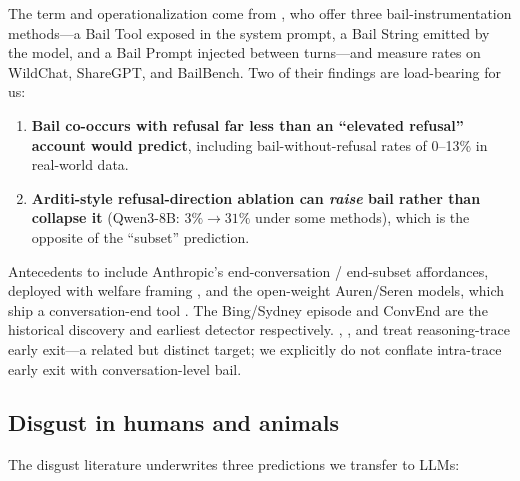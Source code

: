 \documentclass{article}
\begin{document}
The term and operationalization come from \citet{ensign2025bail}, who offer
three bail-instrumentation methods---a Bail Tool exposed in the system prompt,
a Bail String emitted by the model, and a Bail Prompt injected between
turns---and measure rates on WildChat, ShareGPT, and BailBench. Two of their
findings are load-bearing for us:
\begin{enumerate}[leftmargin=*, itemsep=1pt]
    \item \textbf{Bail co-occurs with refusal far less than an ``elevated
    refusal'' account would predict}, including bail-without-refusal rates of
    0--13\% in real-world data.
    \item \textbf{Arditi-style refusal-direction ablation can \emph{raise}
    bail rather than collapse it} (Qwen3-8B: $3\%\!\to\!31\%$ under some
    methods), which is the opposite of the ``subset'' prediction.
\end{enumerate}

Antecedents to \citet{ensign2025bail} include Anthropic's end-conversation /
end-subset affordances, deployed with welfare framing
\citep{anthropic2025endconversation}, and the open-weight Auren/Seren models,
which ship a conversation-end tool \citep{auren2025}. The Bing/Sydney episode
\citep{bing2023sydney} and ConvEnd \citep{convend2023} are the historical
discovery and earliest detector respectively. \citet{lu2025runaway},
\citet{chen2023think}, and \citet{yang2025dynamic} treat reasoning-trace early
exit---a related but distinct target; we explicitly do not conflate
intra-trace early exit with conversation-level bail.

\subsection{Disgust in humans and animals}

The disgust literature underwrites three predictions we transfer to LLMs:
\end{document}
